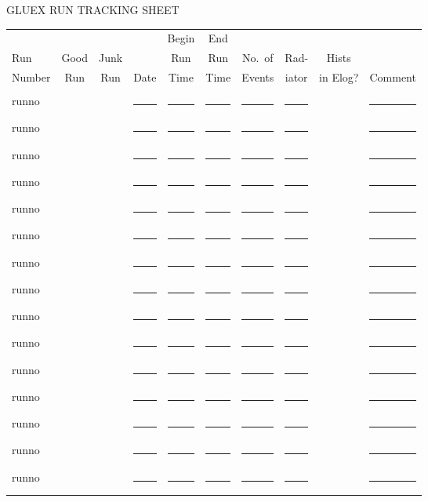 \documentclass[12pt]{article}
\newcommand{\cbox}{\raisebox{.6ex}{\fbox{\rule{0in}{0.05in}\rule{0.05in}{0in}}}}
\newcommand{\eline}{\rule{0.4in}{0.01in}}
\newcommand{\cmline}{\rule{2.0in}{0.01in}}
\begin{document}
\begin{center}
GLUEX RUN TRACKING SHEET
\end{center}

\begin{tabular}{lccccccccc}
       &      &      &      & Begin & End  &         &       &          & \\
Run    & Good & Junk &      & Run   & Run  & No.\ of & Rad-  & Hists    & \\
Number & Run  & Run  & Date & Time  & Time & Events  & iator & in Elog? & Comment\\
\hline
\\[0.240in]
runno & \cbox & \cbox & \eline & \eline & \eline & \eline & \eline & \cbox & \cmline \\[0.240in]
runno & \cbox & \cbox & \eline & \eline & \eline & \eline & \eline & \cbox & \cmline \\[0.240in]
runno & \cbox & \cbox & \eline & \eline & \eline & \eline & \eline & \cbox & \cmline \\[0.240in]
runno & \cbox & \cbox & \eline & \eline & \eline & \eline & \eline & \cbox & \cmline \\[0.240in]
runno & \cbox & \cbox & \eline & \eline & \eline & \eline & \eline & \cbox & \cmline \\[0.240in]
runno & \cbox & \cbox & \eline & \eline & \eline & \eline & \eline & \cbox & \cmline \\[0.240in]
runno & \cbox & \cbox & \eline & \eline & \eline & \eline & \eline & \cbox & \cmline \\[0.240in]
runno & \cbox & \cbox & \eline & \eline & \eline & \eline & \eline & \cbox & \cmline \\[0.240in]
runno & \cbox & \cbox & \eline & \eline & \eline & \eline & \eline & \cbox & \cmline \\[0.240in]
runno & \cbox & \cbox & \eline & \eline & \eline & \eline & \eline & \cbox & \cmline \\[0.240in]
runno & \cbox & \cbox & \eline & \eline & \eline & \eline & \eline & \cbox & \cmline \\[0.240in]
runno & \cbox & \cbox & \eline & \eline & \eline & \eline & \eline & \cbox & \cmline \\[0.240in]
runno & \cbox & \cbox & \eline & \eline & \eline & \eline & \eline & \cbox & \cmline \\[0.240in]
runno & \cbox & \cbox & \eline & \eline & \eline & \eline & \eline & \cbox & \cmline \\[0.240in]
runno & \cbox & \cbox & \eline & \eline & \eline & \eline & \eline & \cbox & \cmline \\[0.240in]

\end{tabular}
\end{document}
